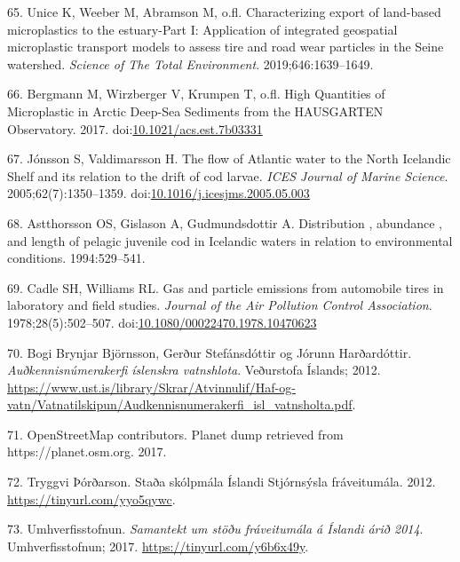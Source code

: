 \documentclass[icelandic,]{book}
\begin{document}
\leavevmode\hypertarget{ref-unice2019characterizing1}{}%
65. Unice K, Weeber M, Abramson M, o.fl. Characterizing export of land-based microplastics to the estuary-Part I: Application of integrated geospatial microplastic transport models to assess tire and road wear particles in the Seine watershed. \emph{Science of The Total Environment}. 2019;646:1639--1649.

\leavevmode\hypertarget{ref-Bergmann2017}{}%
66. Bergmann M, Wirzberger V, Krumpen T, o.fl. High Quantities of Microplastic in Arctic Deep-Sea Sediments from the HAUSGARTEN Observatory. 2017. doi:\href{https://doi.org/10.1021/acs.est.7b03331}{10.1021/acs.est.7b03331}

\leavevmode\hypertarget{ref-Strait2005a}{}%
67. Jónsson S, Valdimarsson H. The flow of Atlantic water to the North Icelandic Shelf and its relation to the drift of cod larvae. \emph{ICES Journal of Marine Science}. 2005;62(7):1350--1359. doi:\href{https://doi.org/10.1016/j.icesjms.2005.05.003}{10.1016/j.icesjms.2005.05.003}

\leavevmode\hypertarget{ref-Astthorsson1994}{}%
68. Astthorsson OS, Gislason A, Gudmundsdottir A. Distribution , abundance , and length of pelagic juvenile cod in Icelandic waters in relation to environmental conditions. 1994:529--541.

\leavevmode\hypertarget{ref-Cadle1978}{}%
69. Cadle SH, Williams RL. Gas and particle emissions from automobile tires in laboratory and field studies. \emph{Journal of the Air Pollution Control Association}. 1978;28(5):502--507. doi:\href{https://doi.org/10.1080/00022470.1978.10470623}{10.1080/00022470.1978.10470623}

\leavevmode\hypertarget{ref-Bj2012}{}%
70. Bogi Brynjar Björnsson, Gerður Stefánsdóttir og Jórunn Harðardóttir. \emph{Auðkennisnúmerakerfi íslenskra vatnshlota}. Veðurstofa Íslands; 2012. \url{https://www.ust.is/library/Skrar/Atvinnulif/Haf-og-vatn/Vatnatilskipun/Audkennisnumerakerfi_isl_vatnsholta.pdf}.

\leavevmode\hypertarget{ref-OpenStreetMap}{}%
71. OpenStreetMap contributors. Planet dump retrieved from https://planet.osm.org. 2017.

\leavevmode\hypertarget{ref-uxdeoruxf0arson2012}{}%
72. Tryggvi Þórðarson. Staða skólpmála Íslandi Stjórnsýsla fráveitumála. 2012. \url{https://tinyurl.com/yyo5qywc}.

\leavevmode\hypertarget{ref-Umhverfisstofnun2017}{}%
73. Umhverfisstofnun. \emph{Samantekt um stöðu fráveitumála á Íslandi árið 2014}. Umhverfisstofnun; 2017. \url{https://tinyurl.com/y6b6x49y}.
\end{document}
